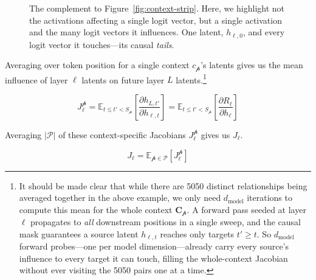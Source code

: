 \documentclass{article}
\newcommand{\logits}{\mathrm{logits}}
\newcommand{\dmodel}{d_{\text{model}}}
\begin{document}
\begin{figure}[htbp]
{}
\caption{The complement to Figure~\ref{fig:context-strip}. Here, we highlight not the activations affecting a single logit vector, but a single activation and the many logit vectors it influences. One latent, $h_{\ell,0}$, and every logit vector it touches---its causal \textit{tails}.}
\label{fig:fan-out}
\end{figure}


Averaging over token position for a single context \(c_{\mathscr{p}}\)'s latents gives us the mean influence of layer \(\ell\) latents on future layer \(L\) latents.\footnote{It should be made clear that while there are 5050 distinct relationships being averaged together in the above example, we only need \(\dmodel\) iterations to compute this mean for the whole context \(\mathbf{C}_{\mathscr{p}}\). A forward pass seeded at layer \(\ell\) propagates to \textit{all} downstream positions in a single sweep, and the causal mask guarantees a source latent \(h_{\ell,t}\) reaches only targets \(t' \ge t\). So \(\dmodel\) forward probes---one per model dimension---already carry every source's influence to every target it can touch, filling the whole-context Jacobian without ever visiting the 5050 pairs one at a time.}

\[J^{\mathscr{p}}_\ell = \mathbb{E}_{t \le t' < S_{\mathscr{p}}}\left[\frac{\partial h_{L,t'}}{\partial h_{\ell,t}}\right] = \mathbb{E}_{t \le t' < S_{\mathscr{p}}}\left[\frac{\partial R_\ell}{\partial h_{\ell}}\right]\]

Averaging \(|\mathscr{P}|\) of these context-specific Jacobians \(J^{\mathscr{p}}_\ell\) gives us \(J_\ell\).

\[J_\ell = \mathbb{E}_{\mathscr{p} \in \mathscr{P}}\left[J^{\mathscr{p}}_\ell\right]\]
\end{document}
